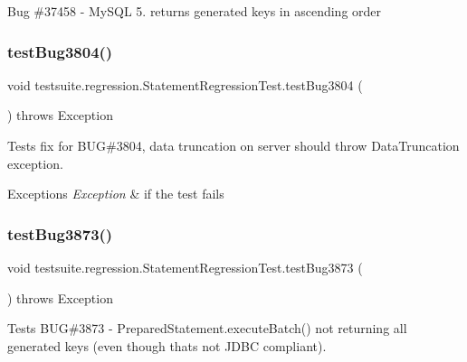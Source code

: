 Bug \#37458 -\/ My\+S\+QL 5. returns generated keys in ascending order \mbox{\label{classtestsuite_1_1regression_1_1_statement_regression_test_aa50b1c76440598f989c311efbcc037df}} 
\subsubsection{\texorpdfstring{test\+Bug3804()}{testBug3804()}}
{\footnotesize\ttfamily void testsuite.\+regression.\+Statement\+Regression\+Test.\+test\+Bug3804 (\begin{DoxyParamCaption}{ }\end{DoxyParamCaption}) throws Exception}

Tests fix for B\+UG\#3804, data truncation on server should throw Data\+Truncation exception.


\begin{DoxyExceptions}{Exceptions}
{\em Exception} & if the test fails \\
\hline
\end{DoxyExceptions}
\mbox{\label{classtestsuite_1_1regression_1_1_statement_regression_test_ae2a11a2595f18543149eec103cbdab74}} 
\subsubsection{\texorpdfstring{test\+Bug3873()}{testBug3873()}}
{\footnotesize\ttfamily void testsuite.\+regression.\+Statement\+Regression\+Test.\+test\+Bug3873 (\begin{DoxyParamCaption}{ }\end{DoxyParamCaption}) throws Exception}

Tests B\+UG\#3873 -\/ Prepared\+Statement.\+execute\+Batch() not returning all generated keys (even though that\textquotesingle{}s not J\+D\+BC compliant).


